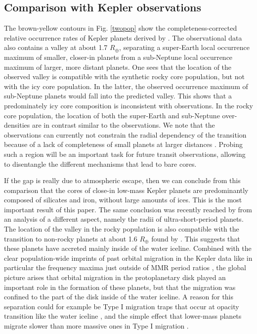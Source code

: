 \documentclass[]{emulateapj}
\def\rearth{R_{\oplus}}
\begin{document}
\subsection{Comparison with Kepler observations}
The brown-yellow contours in Fig. \ref{twopop} show the completeness-corrected relative occurrence rates of Kepler planets derived by \citet{Fulton2017}. The observational data also contains a valley at about 1.7 $\rearth$, separating a super-Earth local occurrence maximum of smaller, closer-in planets from a sub-Neptune local occurrence maximum of larger, more distant planets. One sees that the location of the observed valley is compatible with the synthetic rocky core population, but not with the icy core population. In the latter, the observed  occurrence maximum of  sub-Neptune planets  would fall into the predicted valley. This shows that a predominately icy core composition is inconsistent with observations. In the rocky core  population, the location of both the super-Earth and sub-Neptune over-densities are in contrast similar to the observations. We note that the observations can currently not constrain the radial dependency of the transition because of a lack of completeness of small planets at larger distances \citep{Fulton2017}. Probing such a region will be an important task for future transit observations, allowing to disentangle the different mechanism{s} that lead to bare cores. 

If the gap is really due to atmospheric escape, then we can conclude from this comparison that the cores of close-in low-mass Kepler planets are predominantly composed of silicates and iron, without large amounts of ices.  This is the most important result of this paper. The same conclusion was recently reached by \citet{Lopez2016} from an analysis of a different aspect, namely the radii of ultra-short-period planets. The location of the valley in the rocky population is also compatible with the transition to non-rocky planets at about 1.6 $\rearth$ found by \citet{Rogers2015}. This suggests that these planets have accreted mainly inside of the water iceline. Combined with the clear population-wide imprints of past orbital migration in the Kepler data like in particular the frequency maxima just outside of MMR period ratios \citep{Fabrycky2014}, the global picture arises that orbital migration in the protoplanetary disk played an important role in the formation of these planets, but that the migration was confined to the part of the disk inside of the water iceline. A reason for this separation could for example be Type I migration traps that occur at opacity transition like the water iceline \citep[e.g.,][]{dittkristmordasini2014}, and the simple effect that lower-mass planets migrate slower than more massive ones in Type I migration \citep[e.g.,][]{Ward1997}. 
\end{document}
